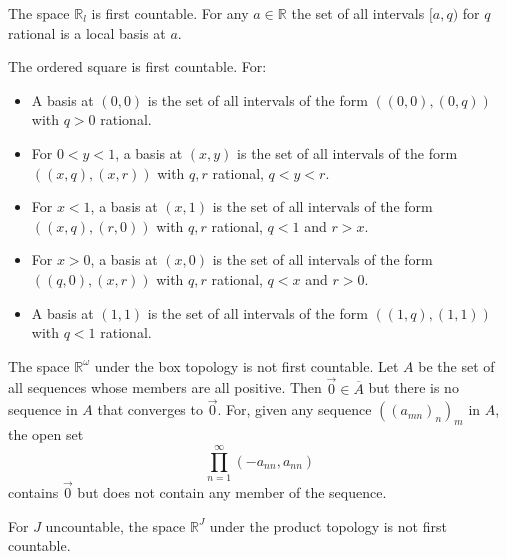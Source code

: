 \begin{ex}
  \enumerate
  \item
  The space $\mathbb{R}_l$ is first countable. For any $a \in \mathbb{R}$ the set of all intervals $[a,q)$ for $q$ rational is a local basis at $a$.
  \item
  The ordered square is first countable. For:
  \begin{itemize}
    \item
    A basis at $(0,0)$ is the set of all intervals of the form $((0,0),(0,q))$ with $q > 0$ rational.
    \item
    For $0 < y < 1$, a basis at $(x,y)$ is the set of all intervals of the form $((x,q), (x,r))$ with $q, r$ rational, $q < y < r$.
    \item
    For $x < 1$, a basis at $(x, 1)$ is the set of all intervals of the form $((x,q), (r, 0))$ with $q, r$ rational, $q < 1$ and $r > x$.
    \item
    For $x > 0$, a basis at $(x, 0)$ is the set of all intervals of the form $((q, 0), (x, r))$ with $q, r$ rational, $q < x$ and $r > 0$.
    \item
    A basis at $(1,1)$ is the set of all intervals of the form $((1,q),(1,1))$ with $q < 1$ rational.
  \end{itemize}
  \item
  The space $\mathbb{R}^\omega$ under the box topology is not first countable. Let $A$ be the set of all sequences whose members are all positive. Then $\vec{0} \in \overline{A}$ but there is no sequence in $A$ that converges to $\vec{0}$. For, given any sequence $((a_{mn})_n)_m$ in $A$, the open set
  \[ \prod_{n=1}^\infty (-a_{nn},a_{nn}) \]
  contains $\vec{0}$ but does not contain any member of the sequence.
\end{ex}

\begin{ex}
  For $J$ uncountable, the space $\mathbb{R}^J$ under the product topology is not first countable.
\end{ex}

